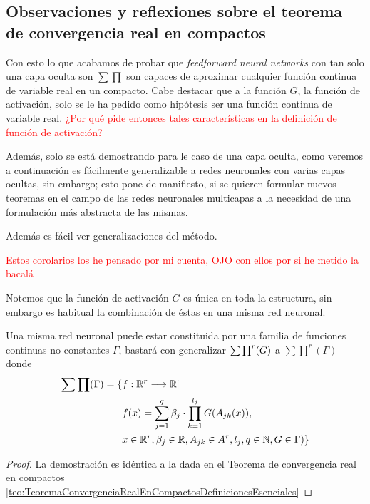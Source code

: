 \subsection{Observaciones y reflexiones sobre el teorema de convergencia real en compactos}

Con esto lo que acabamos de probar que \textit{feedforward neural networks} con tan solo una capa oculta son $\sum \prod$ son capaces de aproximar cualquier 
función continua de variable real en un compacto.  Cabe destacar que a la función $G$, la función de activación, solo se le ha pedido como 
hipótesis ser una función continua de variable real. \textcolor{red}{¿Por qué pide entonces tales características en la definición de 
función de activación?}    

Además, solo se está demostrando para le caso de una capa oculta, como veremos a continuación es fácilmente generalizable a redes neuronales 
con varias capas ocultas, sin embargo; esto pone de manifiesto, si se quieren formular nuevos teoremas en el campo de las redes neuronales
multicapas a la necesidad de una formulación más abstracta de las mismas. 

Además es fácil ver generalizaciones del método. 

\textcolor{red}{Estos corolarios los he pensado por mi cuenta, OJO con ellos por si he metido la bacalá}

Notemos que la función de activación $G$ es única en toda la estructura,
sin embargo es habitual la combinación de éstas en una misma red neuronal. 

\begin{corolario}

    Una misma red neuronal puede estar constituida por una familia de funciones continuas no constantes $\Gamma$, 
    bastará con generalizar $\sum \prod^r (G)$ a $\sum \prod ^r (\Gamma)$ donde 
    \begin{equation}
        \begin{split}
            \sum \prod (\Gamma) = \{ 
                &f: \mathbb{R}^r \longrightarrow \mathbb{R} | \\
                & f(x) = \sum_{j = 1} ^q  \beta_j \cdot \prod_{k=1}^{l_j}
                G(A_{jk}(x)), \\
                &x  \in \mathbb{R}^r, \beta_j \in \mathbb{R}, A_{jk}\in A^r, l_j,q \in \mathbb{N}, G \in \Gamma
                )
                \}
        \end{split}
    \end{equation}
\end{corolario}
\begin{proof}
    La demostración es idéntica a la dada en el Teorema de convergencia 
    real en compactos \ref{teo:TeoremaConvergenciaRealEnCompactosDefinicionesEsenciales}
\end{proof}

